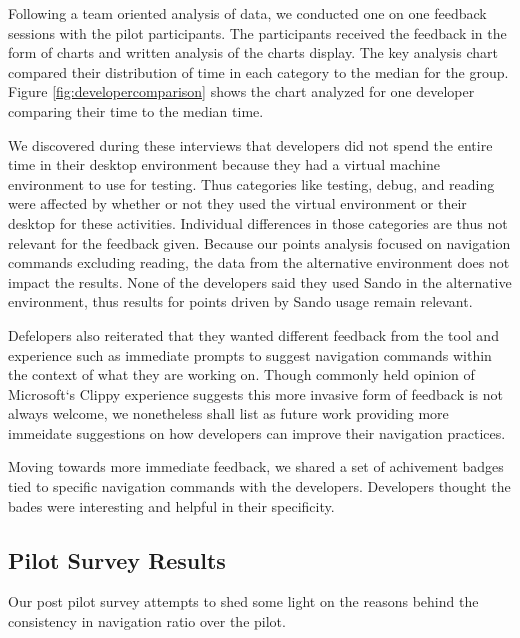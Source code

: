 \documentclass{sig-alternate}
\begin{document}
Following a team oriented analysis of data, we conducted one on one feedback sessions with the pilot participants.  The participants received the feedback in the form of charts and written analysis of the charts display.  The key analysis chart compared their distribution of time in each category to the median for the group.  Figure \ref{fig:developercomparison} shows the chart analyzed for one developer comparing their time to the median time.  

We discovered during these interviews that developers did not spend the entire time in their desktop environment because they had a virtual machine environment to use for testing.  Thus categories like testing, debug, and reading were affected by whether or not they used the virtual environment or their desktop for these activities.  Individual differences in those categories are thus not relevant for the feedback given. Because our points analysis focused on navigation commands excluding reading, the data from the alternative environment does not impact the results.  None of the developers said they used Sando in the alternative environment, thus results for points driven by Sando usage remain relevant.  

Defelopers also reiterated that they wanted different feedback from the tool and experience such as immediate prompts to suggest navigation commands within the context of what they are working on.  Though commonly held opinion of Microsoft`s Clippy experience suggests this more invasive form of feedback is not always welcome, we nonetheless shall list as future work providing more immeidate suggestions on how developers can improve their navigation practices. 

Moving towards more immediate feedback, we shared a set of achivement badges tied to specific navigation commands  with the developers.  Developers thought the bades were interesting and helpful in their specificity.

\subsection{Pilot Survey Results}

Our post pilot survey attempts to shed some light on the reasons behind the consistency in navigation ratio over the pilot.    
\end{document}
